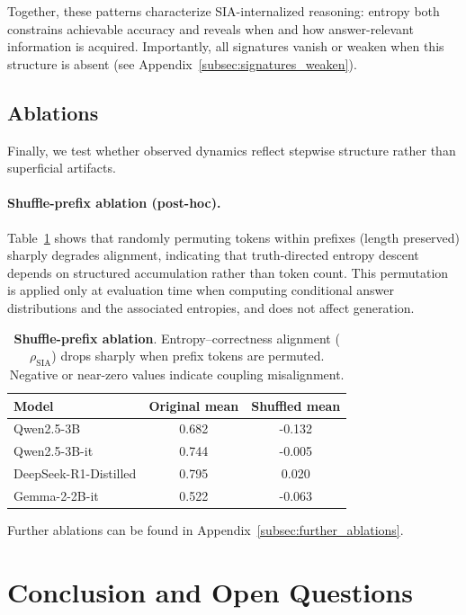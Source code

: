 \documentclass{article}
\newcommand{\bad}[1]{{\color{failred} #1}}
\newcommand{\weak}[1]{{\color{weakorange} #1}}
\begin{document}
Together, these patterns characterize SIA-internalized reasoning: entropy both constrains achievable accuracy and reveals when and how answer-relevant information is acquired. Importantly, all signatures vanish or weaken when this structure is absent (see Appendix~\ref{subsec:signatures_weaken}). 

\subsection{Ablations}
\label{sec:ablations}

Finally, we test whether observed dynamics reflect stepwise structure rather than superficial artifacts.

\paragraph{Shuffle-prefix ablation (post-hoc).}
Table~\ref{fig:shuffle_ablation} shows that randomly permuting tokens within prefixes (length preserved) sharply degrades alignment, indicating that truth-directed entropy descent depends on structured accumulation rather than token count. This permutation is applied only at evaluation time when computing conditional answer distributions and the associated entropies, and does not affect generation.

\begin{table}[hbtp!]
\caption{\textbf{Shuffle-prefix ablation}. Entropy--correctness alignment ($\rho_{\text{SIA}}$) drops sharply when prefix tokens are permuted. \bad{Negative} or \weak{near-zero} values indicate coupling misalignment.}
\label{fig:shuffle_ablation}
\centering
\small
\begin{tabular}{lcc}
\toprule
\textbf{Model} & {Original mean} & {Shuffled mean} \\
\midrule
Qwen2.5-3B      &  0.682 & \bad{-0.132} \\
Qwen2.5-3B-it   &  0.744 & \bad{-0.005} \\
DeepSeek-R1-Distilled    &  0.795 &  \weak{0.020} \\
Gemma-2-2B-it   &  0.522 & \bad{-0.063} \\
\bottomrule
\end{tabular}
\end{table}

Further ablations can be found in Appendix~\ref{subsec:further_ablations}.

\section{Conclusion and Open Questions}
\label{sec:open_quest}
\end{document}
